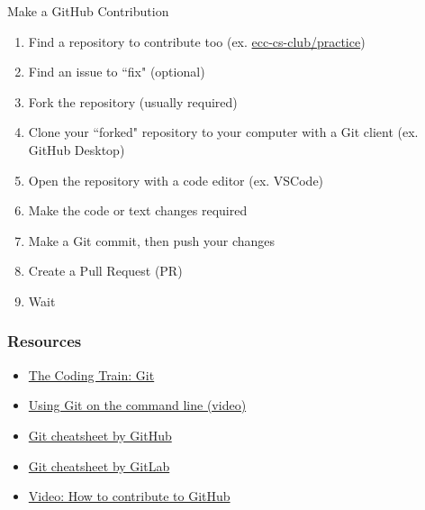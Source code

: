 \documentclass{beamer}
\begin{document}
\begin{frame}{Make a GitHub Contribution}
	\begin{enumerate}
		\item Find a repository to contribute too (ex. \href{https://github.com/ecc-cs-club/practice}{ecc-cs-club/practice})
		\item Find an issue to ``fix" (optional)
		\item Fork the repository (usually required)
		\item Clone your ``forked" repository to your computer with a Git client (ex. GitHub Desktop)
		\item Open the repository with a code editor (ex. VSCode)
		\item Make the code or text changes required
		\item Make a Git commit, then push your changes
		\item Create a Pull Request (PR)
		\item Wait
	\end{enumerate}
\end{frame}

\begin{frame}
	\frametitle{Resources}

	\begin{itemize}
		\item \href{https://www.youtube.com/watch?v=BCQHnlnPusY&list=PLRqwX-V7Uu6ZF9C0YMKuns9sLDzK6zoiV}{The Coding Train: Git}
		\item \href{https://www.youtube.com/watch?v=USjZcfj8yxE}{Using Git on the command line (video)}
		\item \href{https://education.github.com/git-cheat-sheet-education.pdf}{Git cheatsheet by GitHub}
		\item \href{https://about.gitlab.com/images/press/git-cheat-sheet.pdf}{Git cheatsheet by GitLab}
		\item \href{https://www.youtube.com/watch?v=yr6IzOGoMsQ}{Video: How to contribute to GitHub}
	\end{itemize}
\end{frame}
\end{document}
